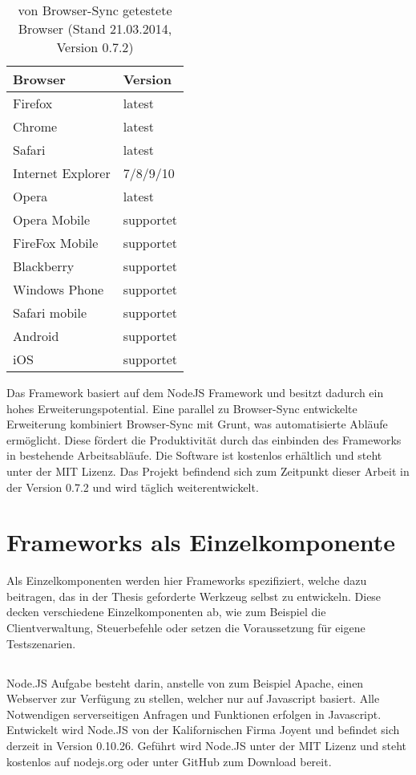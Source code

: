 		\begin{table}[H]
 		\centering
			\begin{tabular}{| p{5cm} | p{5cm} |}
			
			\hline
				Browser 	& 	Version\\
			\hline
			\hline
				Firefox	&	latest\\
				Chrome	&	latest\\
				Safari	&	latest\\
				Internet Explorer	&	7/8/9/10\\
				Opera	&	latest\\
				Opera Mobile	&	supportet\\
				FireFox Mobile	&	supportet\\
				Blackberry	&	supportet\\
				Windows Phone	&	supportet\\
				Safari mobile	&	supportet\\	
				Android	&	supportet\\
				iOS		&	supportet\\
				\hline
				\end{tabular}
			\caption{von Browser-Sync getestete Browser (Stand 21.03.2014, Version 0.7.2)}
	\end{table}
	
	Das Framework basiert auf dem NodeJS Framework und besitzt dadurch ein hohes Erweiterungspotential. Eine parallel zu 		Browser-Sync entwickelte Erweiterung kombiniert Browser-Sync mit Grunt, was automatisierte Abläufe ermöglicht. Diese fördert 	die Produktivität durch das einbinden des Frameworks in bestehende Arbeitsabläufe. Die Software ist kostenlos erhältlich und 		steht unter der MIT Lizenz. Das Projekt befindend sich zum Zeitpunkt dieser Arbeit in der Version 0.7.2 und wird täglich 			weiterentwickelt.

\pagebreak
\section{Frameworks als Einzelkomponente}
	Als Einzelkomponenten werden hier Frameworks spezifiziert, welche dazu beitragen, das in der Thesis geforderte Werkzeug 		selbst zu entwickeln. Diese decken verschiedene Einzelkomponenten ab, wie zum Beispiel die Clientverwaltung, Steuerbefehle 	oder setzen die Voraussetzung für eigene Testszenarien.
	
	\subsection{}
	Node.JS Aufgabe besteht darin, anstelle von zum Beispiel Apache, einen Webserver zur Verfügung zu stellen, welcher nur auf 		Javascript basiert. Alle Notwendigen serverseitigen Anfragen und Funktionen erfolgen in Javascript. Entwickelt wird Node.JS von 	der Kalifornischen Firma Joyent und befindet sich derzeit in Version 0.10.26. Geführt wird Node.JS unter der MIT Lizenz und 		steht kostenlos auf nodejs.org oder unter GitHub zum Download bereit.
	
